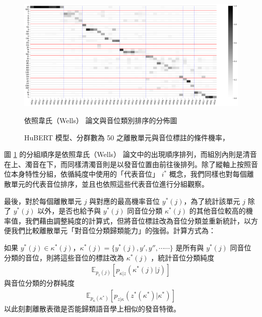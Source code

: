 \begin{figure}
    \centering
    \includegraphics[width=1\linewidth]{figures/hubert-50-givenunit-byphn.png}
    \caption[]{%
        HuBERT 模型、分群數為 50 之離散單元與音位標註的條件機率，}
                                                    依照韋氏（Wells） \cite{wells_phonetic_2022} 論文與音位類別排序的分佈圖
    \label{fig:hubert-50-givenunit-byphn}
\end{figure}

        圖 \ref{fig:hubert-50-givenunit-byphn} 的分組順序是依照韋氏（Wells） \cite{wells_phonetic_2022} 論文中的出現順序排列，而組別內則是清音在上、濁音在下，而同樣清濁音則是以發音位置由前往後排列。除了縱軸上按照音位本身特性分組，依循純度中使用的「代表音位」 $i^\ast$ 概念，我們同樣也對每個離散單元的代表音位排序，並且也依照這些代表音位進行分組觀察。

最後，對於每個離散單元 $j$ 與對應的最高機率音位 $y^*(j)$，為了統計該單元 $j$ 除了 $y^*(j)$ 以外，是否也給予與 $y^*(j)$ 同音位分類 $\kappa^*(j)$ 的其他音位較高的機率值，我們藉由調整純度的計算式，但將音位標註改為音位分類並重新統計，以方便我們比較離散單元「對音位分類歸類能力」的強弱。計算方式為：

如果 $y^*(j) \in \kappa^*(j)$，$ \kappa^*(j) = \{y^*(j), y', y'', \cdots\cdots\}$  是所有與  $y^*(j)$ 同音位分類的音位，則將這些音位的標註改為 $ \kappa^*(j) $ ，統計音位分類純度
\begin{align}
    \mathbb{E}_{p_z(j)}\left[p_{ \kappa|z}( \kappa^*(j)|j) \right]
\end{align}
與音位分類的分群純度
\begin{align}
    \mathbb{E}_{p_ \kappa(\kappa^*)}\left[p_{z| \kappa}(z^*( \kappa^*)|\kappa^*) \right]
\end{align}
以此刻劃離散表徵是否能歸類語音學上相似的發音特徵。


